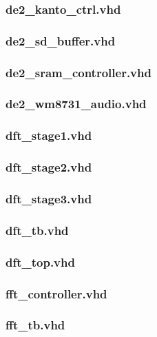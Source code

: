 \documentclass{article}
\begin{document}
	\subsubsection{de2\_kanto\_ctrl.vhd}
	
	\subsubsection{de2\_sd\_buffer.vhd}
	
	\subsubsection{de2\_sram\_controller.vhd}
	
	\subsubsection{de2\_wm8731\_audio.vhd}
	
	\subsubsection{dft\_stage1.vhd}
	
	\subsubsection{dft\_stage2.vhd}
	
	\subsubsection{dft\_stage3.vhd}
	
	\subsubsection{dft\_tb.vhd}
	
	\subsubsection{dft\_top.vhd}
	
	\subsubsection{fft\_controller.vhd}
	
	\subsubsection{fft\_tb.vhd}
	
\end{document}
